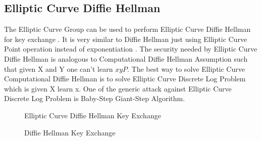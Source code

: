 \subsection{Elliptic Curve Diffie Hellman}

The Elliptic Curve Group can be used to perform Elliptic Curve Diffie Hellman for key exchange . It is very similar to Diffie Hellman just using Elliptic Curve Point operation instead of exponentiation . The security needed by Elliptic Curve Diffie Hellman is analogous to Computational Diffie Hellman Assumption such that given X and Y one can't learn $xyP$. The best way to solve Elliptic Curve Computational Diffie Hellman is to solve Elliptic Curve Discrete Log Problem which is given X learn x. One of the generic attack against Elliptic Curve Discrete Log Problem is Baby-Step Giant-Step Algorithm.

\begin{figure}[t]
  \centering
  \caption{Elliptic Curve Diffie Hellman Key Exchange}
  \label{fig:ecdh}
\end{figure}

\begin{figure}[t]
  \centering
  \caption{Diffie Hellman Key Exchange }
  \label{fig:dh}
\end{figure}


